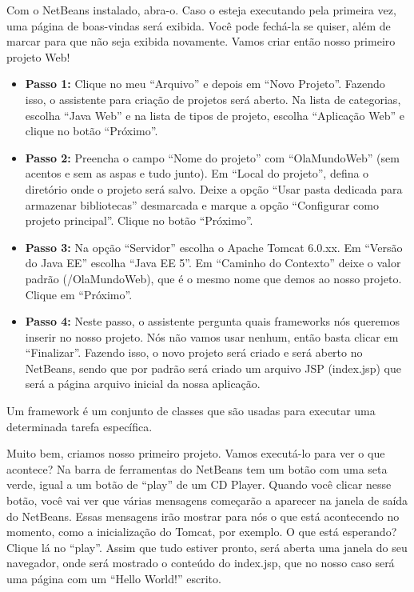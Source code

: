 Com o NetBeans instalado, abra-o. Caso o esteja executando pela primeira vez, uma página de boas-vindas será exibida. Você pode fechá-la se quiser, além de marcar para que não seja exibida novamente. Vamos criar então nosso primeiro projeto Web!

\begin{itemize}

    \item \textbf{Passo 1:} Clique no meu ``Arquivo'' e depois em ``Novo Projeto''. Fazendo isso, o assistente para criação de projetos será aberto. Na lista de categorias, escolha ``Java Web'' e na lista de tipos de projeto, escolha ``Aplicação Web'' e clique no botão ``Próximo''. 
    
    \item \textbf{Passo 2:} Preencha o campo ``Nome do projeto'' com ``OlaMundoWeb'' (sem acentos e sem as aspas e tudo junto). Em ``Local do projeto'', defina o diretório onde o projeto será salvo. Deixe a opção ``Usar pasta dedicada para armazenar bibliotecas'' desmarcada e marque a opção ``Configurar como projeto principal''. Clique no botão ``Próximo''.
    
    \item \textbf{Passo 3:} Na opção ``Servidor'' escolha o Apache Tomcat 6.0.xx. Em ``Versão do Java EE'' escolha ``Java EE 5''. Em ``Caminho do Contexto'' deixe o valor padrão (/OlaMundoWeb), que é o mesmo nome que demos ao nosso projeto. Clique em ``Próximo''.
    
    \item \textbf{Passo 4:} Neste passo, o assistente pergunta quais frameworks nós queremos inserir no nosso projeto. Nós não vamos usar nenhum, então basta clicar em ``Finalizar''. Fazendo isso, o novo projeto será criado e será aberto no NetBeans, sendo que por padrão será criado um arquivo JSP (index.jsp) que será a página arquivo inicial da nossa aplicação.
    
\end{itemize}

\begin{saibaMais}
    Um framework é um conjunto de classes que são usadas para executar uma determinada tarefa específica.
\end{saibaMais}

Muito bem, criamos nosso primeiro projeto. Vamos executá-lo para ver o que acontece? Na barra de ferramentas do NetBeans tem um botão com uma seta verde, igual a um botão de ``play'' de um CD Player. Quando você clicar nesse botão, você vai ver que várias mensagens começarão a aparecer na janela de saída do NetBeans. Essas mensagens irão mostrar para nós o que está acontecendo no momento, como a inicialização do Tomcat, por exemplo. O que está esperando? Clique lá no ``play''. Assim que tudo estiver pronto, será aberta uma janela do seu navegador, onde será mostrado o conteúdo do index.jsp, que no nosso caso será uma página com um ``Hello World!'' escrito.

